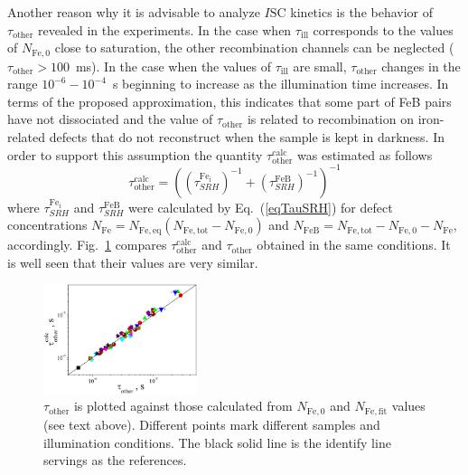 \documentclass[%
 aip,jap,
 amsmath,amssymb,
 reprint,%
]{revtex4-1}
\begin{document}
Another reason why it is advisable to analyze $I\mathrm{SC}$ kinetics is the behavior of 
$\tau_\mathrm{other}$ revealed in the experiments. 
In the case when $\tau_\mathrm{ill}$ corresponds to the values of $N_\mathrm{Fe,0}$ close to saturation, the other recombination channels  can be neglected ($\tau_\mathrm{other}> 100$~ms). 
In the case when the values of $\tau_\mathrm{ill}$ are small, 
$\tau_\mathrm{other}$ changes in the range $10^{-6}-10^{-4}$~s beginning to increase as the illumination time increases. 
In terms of the proposed approximation, this indicates that some part of FeB pairs have not dissociated and the value of $\tau_\mathrm{other}$ is related 
to recombination on iron-related defects that do not reconstruct when the sample is kept in darkness. In order to support this assumption the quantity 
$\tau_\mathrm{other}^\mathrm{calc}$
was estimated as follows
\begin{equation*}
\tau_\mathrm{other}^\mathrm{calc}=\left(\left(\tau_{SRH}^\mathrm{Fe_i}\right)^{-1}
+\left(\tau_{SRH}^\mathrm{FeB}\right)^{-1}\right)^{-1}
\end{equation*}
where
$\tau_{SRH}^\mathrm{Fe_i}$ and $\tau_{SRH}^\mathrm{FeB}$ 
were calculated by Eq.~(\ref{eqTauSRH}) for defect concentrations 
$N_\mathrm{Fe}=N_\mathrm{Fe,eq}(N_\mathrm{Fe,tot}-N_\mathrm{Fe,0})$ 
and $N_\mathrm{FeB}= N_\mathrm{Fe,tot}-N_\mathrm{Fe,0}- N_\mathrm{Fe}$, accordingly. 
Fig.~\ref{Fig:TauOther} compares $\tau_\mathrm{other}^\mathrm{calc}$ and 
$\tau_\mathrm{other}$
obtained in the same conditions. 
It is well seen that their values are very similar.
\begin{figure}
\includegraphics[width=0.4\textwidth]{Fig6}%
\caption{\label{Fig:TauOther}
$\tau_\mathrm{other}$ is plotted against those calculated from 
$N_\mathrm{Fe,0}$ and $N_\mathrm{Fe,fit}$ values (see text above). 
Different points mark different samples and illumination conditions. 
The black solid line is the identify line servings as the references.
}
\end{figure}
\end{document}
